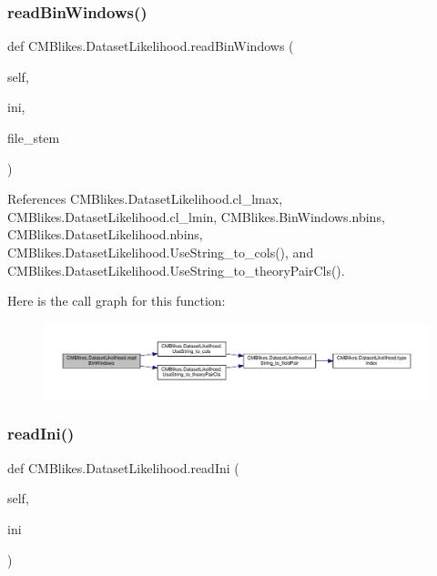\subsubsection{\texorpdfstring{read\+Bin\+Windows()}{readBinWindows()}}
{\footnotesize\ttfamily def C\+M\+Blikes.\+Dataset\+Likelihood.\+read\+Bin\+Windows (\begin{DoxyParamCaption}\item[{}]{self,  }\item[{}]{ini,  }\item[{}]{file\+\_\+stem }\end{DoxyParamCaption})}



References C\+M\+Blikes.\+Dataset\+Likelihood.\+cl\+\_\+lmax, C\+M\+Blikes.\+Dataset\+Likelihood.\+cl\+\_\+lmin, C\+M\+Blikes.\+Bin\+Windows.\+nbins, C\+M\+Blikes.\+Dataset\+Likelihood.\+nbins, C\+M\+Blikes.\+Dataset\+Likelihood.\+Use\+String\+\_\+to\+\_\+cols(), and C\+M\+Blikes.\+Dataset\+Likelihood.\+Use\+String\+\_\+to\+\_\+theory\+Pair\+Cls().

Here is the call graph for this function\+:
\nopagebreak
\begin{figure}[H]
\begin{center}
\leavevmode
\includegraphics[width=350pt]{classCMBlikes_1_1DatasetLikelihood_a0be6ad34af94442ef5f81038b4691a40_cgraph}
\end{center}
\end{figure}
\mbox{\label{classCMBlikes_1_1DatasetLikelihood_adb3126cf73eb96c8f6b877dc4a44e297}} 
\subsubsection{\texorpdfstring{read\+Ini()}{readIni()}}
{\footnotesize\ttfamily def C\+M\+Blikes.\+Dataset\+Likelihood.\+read\+Ini (\begin{DoxyParamCaption}\item[{}]{self,  }\item[{}]{ini }\end{DoxyParamCaption})}



